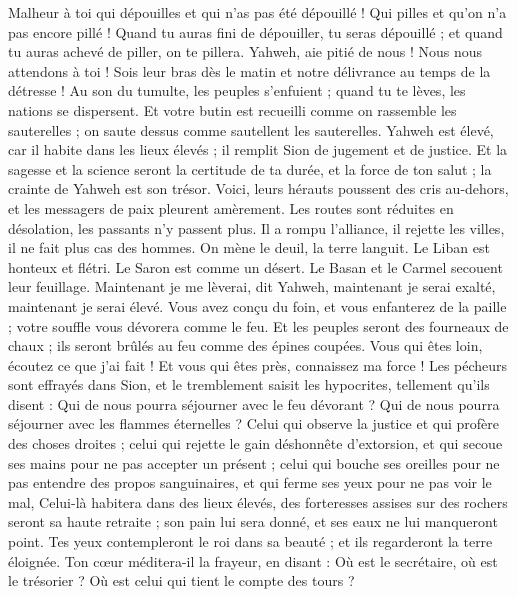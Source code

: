\begin{multicols}{2}
\VerseOne{}Malheur à toi qui dépouilles et qui n'as pas été dépouillé ! Qui pilles et qu'on n'a pas encore pillé ! Quand tu auras fini de dépouiller, tu seras dépouillé ; et quand tu auras achevé de piller, on te pillera.
Yahweh, aie pitié de nous ! Nous nous attendons à toi ! Sois leur bras dès le matin et notre délivrance au temps de la détresse !
Au son du tumulte, les peuples s'enfuient ; quand tu te lèves, les nations se dispersent.
Et votre butin est recueilli comme on rassemble les sauterelles ; on saute dessus comme sautellent les sauterelles.
Yahweh est élevé, car il habite dans les lieux élevés ; il remplit Sion de jugement et de justice.
Et la sagesse et la science seront la certitude de ta durée, et la force de ton salut ; la crainte de Yahweh est son trésor.
Voici, leurs hérauts poussent des cris au-dehors, et les messagers de paix pleurent amèrement.
Les routes sont réduites en désolation, les passants n'y passent plus. Il a rompu l'alliance, il rejette les villes, il ne fait plus cas des hommes.
On mène le deuil, la terre languit. Le Liban est honteux et flétri. Le Saron est comme un désert. Le Basan et le Carmel secouent leur feuillage.
Maintenant je me lèverai, dit Yahweh, maintenant je serai exalté, maintenant je serai élevé.
Vous avez conçu du foin, et vous enfanterez de la paille ; votre souffle vous dévorera comme le feu.
Et les peuples seront des fourneaux de chaux ; ils seront brûlés au feu comme des épines coupées.
Vous qui êtes loin, écoutez ce que j'ai fait ! Et vous qui êtes près, connaissez ma force !
Les pécheurs sont effrayés dans Sion, et le tremblement saisit les hypocrites, tellement qu'ils disent : Qui de nous pourra séjourner avec le feu dévorant ? Qui de nous pourra séjourner avec les flammes éternelles ?
Celui qui observe la justice et qui profère des choses droites ; celui qui rejette le gain déshonnête d'extorsion, et qui secoue ses mains pour ne pas accepter un présent ; celui qui bouche ses oreilles pour ne pas entendre des propos sanguinaires, et qui ferme ses yeux pour ne pas voir le mal,
Celui-là habitera dans des lieux élevés, des forteresses assises sur des rochers seront sa haute retraite ; son pain lui sera donné, et ses eaux ne lui manqueront point.
Tes yeux contempleront le roi dans sa beauté ; et ils regarderont la terre éloignée.
Ton cœur méditera-il la frayeur, en disant : Où est le secrétaire, où est le trésorier ? Où est celui qui tient le compte des tours ?

\end{multicols}
